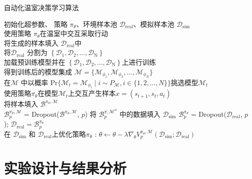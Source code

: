 \begin{algorithm}[ht]
\caption{自动化温室决策学习算法}
\begin{algorithmic}
\STATE 初始化超参数、 策略 $\pi_\theta$、环境样本池 $\mathcal{D}_{\mathrm{real}}$、模拟样本池 $\mathcal{D}_{\mathrm{sim}}$\\
    \STATE 使用策略 $\pi_\theta$在温室中交互采取行动\\
    \STATE 将生成的样本填入 $\mathcal{D}_{\mathrm{real}}$中\\
    \STATE 将$\mathcal{D}_{\mathrm{real}}$ 分割为 $\left\{\mathcal{D}_{\mathrm{1}}, \mathcal{D}_{\mathrm{2}}, \ldots, \mathcal{D}_{\mathrm{N}}\right\}$\\
        \STATE 加载预训练模型并在 $\left\{\mathcal{D}_{\mathrm{1}}, \mathcal{D}_{\mathrm{2}}, \ldots, \mathcal{D}_{\mathrm{N}}\right\}$上进行训练\\
        \STATE 得到训练后的模型集成 $\mathcal{M} = \{\mathcal{M}_{\phi_1},\mathcal{M}_{\phi_2},\ldots,\mathcal{M}_{\phi_{N}}\}$\\
            \STATE 在$\mathcal{M}$ 中以概率 $\mathrm{Pr}\{\mathcal{M}_t=\mathcal{M}_{\phi_i}\mid i\sim P_{\mathcal{M}}, i\in\{1,2,\ldots,N\}\}$挑选模型$\mathcal{M}_t$\\
            \STATE 使用策略$\pi_\theta$在模型$\mathcal{M}_t$上交互产生样本$x=\left(s_{t+1},s_t,a_t\right)$ \\
            \STATE 将样本填入 $\mathcal{B}^{\pi_\theta,\mathcal{M}}$\\
        \ENDFOR
        \STATE $\mathcal{B}^{\pi_\theta,\mathcal{M}}_p$ = Dropout($\mathcal{B}^{\pi_\theta,\mathcal{M}}$, $p$)
        \STATE 将 $\mathcal{B}^{\pi,\mathcal{M}^\alpha}_p$ 中的数据填入 $\mathcal{D}_\mathrm{sim}$
    \ENDFOR
    \STATE $\mathcal{B}^{\pi_\theta}_p$ = Dropout($\mathcal{D}_{\mathrm{real}}$, $p$); $\mathcal{D}_{\mathrm{real}} = \mathcal{B}^{\pi_\theta}_p$\\
    \STATE 在 $\mathcal{D}_{\mathrm{sim}}$ 和 $\mathcal{D}_{\mathrm{real}}$上优化策略$\pi_\theta$ : $\theta\leftarrow \theta - \lambda\nabla_\theta V^{{\pi_\theta},\mathcal{M}}_p(\mathcal{D}_{\mathrm{sim}}; \mathcal{D}_{\mathrm{real}})$
\ENDFOR
\end{algorithmic}\label{algo:acml-method}
\end{algorithm}

\section{实验设计与结果分析}

